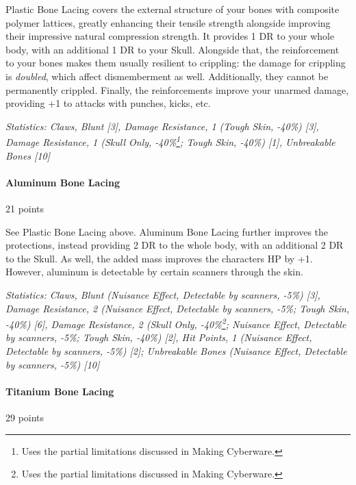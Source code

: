 \begin{multicols*}{3}
	Plastic Bone Lacing covers the external structure of your bones with composite polymer lattices, greatly enhancing their tensile strength alongside improving their impressive natural compression strength. It provides 1 DR to your whole body, with an additional 1 DR to your Skull. Alongside that, the reinforcement to your bones makes them usually resilient to crippling: the damage for crippling is \textit{doubled}, which affect dismemberment as well. Additionally, they cannot be permanently crippled. Finally, the reinforcements improve your unarmed damage, providing +1 to attacks with punches, kicks, etc.
	
	\textit{\textcolor{OliveGreen}{Statistics: Claws, Blunt [3], Damage Resistance, 1 (Tough Skin, -40\%) [3], Damage Resistance, 1 (Skull Only, -40\%\footnote {Uses the partial limitations discussed in Making Cyberware.}; Tough Skin, -40\%) [1], Unbreakable Bones [10]}}
	
	\paragraph{Aluminum Bone Lacing}
	\begin{flushright}
		21 points
	\end{flushright}
	
	See Plastic Bone Lacing above. Aluminum Bone Lacing further improves the protections, instead providing 2 DR to the whole body, with an additional 2 DR to the Skull. As well, the added mass improves the characters HP by +1. However, aluminum is detectable by certain scanners through the skin.
	
	\textit{\textcolor{OliveGreen}{Statistics: Claws, Blunt (Nuisance Effect, Detectable by scanners,  -5\%) [3], Damage Resistance, 2 (Nuisance Effect, Detectable by scanners, -5\%; Tough Skin, -40\%) [6], Damage Resistance, 2 (Skull Only, -40\%\footnote {Uses the partial limitations discussed in Making Cyberware.}; Nuisance Effect, Detectable by scanners, -5\%; Tough Skin, -40\%) [2], Hit Points, 1 (Nuisance Effect, Detectable by scanners,  -5\%) [2]; Unbreakable Bones (Nuisance Effect, Detectable by scanners,  -5\%) [10]}}
	
	\paragraph{Titanium Bone Lacing}
	\begin{flushright}
		29 points
	\end{flushright}
	

\end{multicols*}
